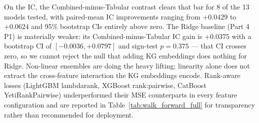 \documentclass[10pt,journal,compsoc]{IEEEtran}
\begin{document}
On the IC, the Combined-minus-Tabular contrast clears that bar for 8 of the 13 models tested, with paired-mean IC improvements ranging from $+0.0429$ to $+0.0624$ and 95\% bootstrap CIs entirely above zero. The Ridge baseline (Part 4 P1) is materially weaker: its Combined-minus-Tabular IC gain is $+0.0375$ with a bootstrap CI of $[-0.0036, +0.0797]$ and sign-test $p=0.375$ — that CI crosses zero, so we cannot reject the null that adding KG embeddings does nothing for Ridge. Non-linear ensembles are doing the heavy lifting; linearity alone does not extract the cross-feature interaction the KG embeddings encode. Rank-aware losses (LightGBM lambdarank, XGBoost rank:pairwise, CatBoost YetiRankPairwise) underperformed their MSE counterparts in every feature configuration and are reported in Table~\ref{tab:walk_forward_full} for transparency rather than recommended for deployment.
\end{document}
